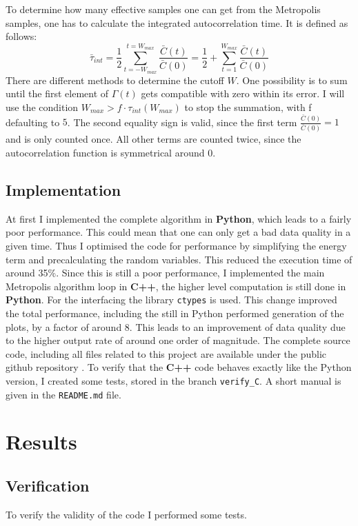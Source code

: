 \documentclass{scrartcl}
\begin{document}
		To determine how many effective samples one can get from the Metropolis samples, one has to calculate the integrated autocorrelation time.
		It is defined as follows:
		\begin{equation}
			\bar \tau_{int} = \frac 12 \sum_{t = -W_{max}}^{t = W_{max}} \frac {\bar C(t)}{\bar C(0)} = \frac 12 + \sum_{t = 1}^{W_{max}} \frac {\bar C(t)}{\bar C(0)}
			\label{eq:integrated_autocorrelation}
		\end{equation}
		There are different methods to determine the cutoff $W$.
		One possibility is to sum until the first element of $\Gamma(t)$ gets compatible with zero within its error.
		I will use the condition $W_{max} > f \cdot \tau_{int}(W_{max})$ to stop the summation, with f defaulting to $5$.
		The second equality sign is valid, since the first term $\frac {\bar C(0)}{\bar C(0)} = 1$ and is only counted once.
		All other terms are counted twice, since the autocorrelation function is symmetrical around 0.

	\subsection{Implementation}
		At first I implemented the complete algorithm in \textbf{Python}, which leads to a fairly poor performance.
		This could mean that one can only get a bad data quality in a given time.
		Thus I optimised the code for performance by simplifying the energy term and precalculating the random variables.
		This reduced the execution time of around 35\%.
		Since this is still a poor performance, I implemented the main Metropolis algorithm loop in \textbf{C++}, the higher level computation is still done in \textbf{Python}.
		For the interfacing the library \verb!ctypes! is used.
		This change improved the total performance, including the still in Python performed generation of the plots, by a factor of around 8.
		This leads to an improvement of data quality due to the higher output rate of around one order of magnitude.
		The complete source code, including all files related to this project are available under the public github repository \cite{github}.
		To verify that the \textbf{C++} code behaves exactly like the Python version, I created some tests, stored in the branch \verb!verify_C!.
		A short manual is given in the \verb!README.md! file.
	\section{Results}
	\subsection{Verification}
		To verify the validity of the code I performed some tests.
\end{document}
